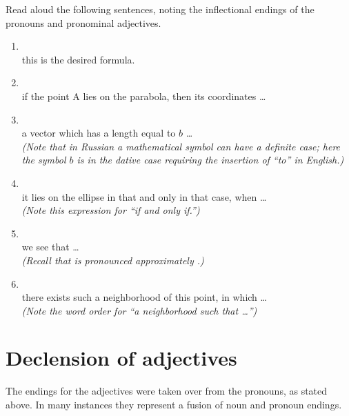\begin{keybox}[Exercise 3.2]
Read aloud the following sentences, noting the inflectional endings of the pronouns and pronominal adjectives.
\end{keybox}

\begin{enumerate}[label=\arabic*)]
\item {}\\
      this is the desired formula.
\item {}\\
      if the point A lies on the parabola, then its coordinates \ldots
\item {}\\
      a vector which has a length equal to $b$ \ldots\\[-1mm]
      \emph{(Note that in Russian a mathematical symbol can have a definite case; here the symbol $b$ is in the dative case requiring the insertion of ``to'' in English.)}
\item {}\\
      it lies on the ellipse in that and only in that case, when \ldots\\[-1mm]
      \emph{(Note this expression for ``if and only if.'')}
\item {}\\
      we see that \ldots\\[-1mm]
      \emph{(Recall that  is pronounced approximately .)}
\item {}\\
      there exists such a neighborhood of this point, in which \ldots\\[-1mm]
      \emph{(Note the word order for ``a neighborhood such that \ldots'')}
\end{enumerate}

\section{Declension of adjectives}

The endings for the adjectives were taken over from the pronouns, as stated above. In many instances they represent a fusion of noun and pronoun endings.

